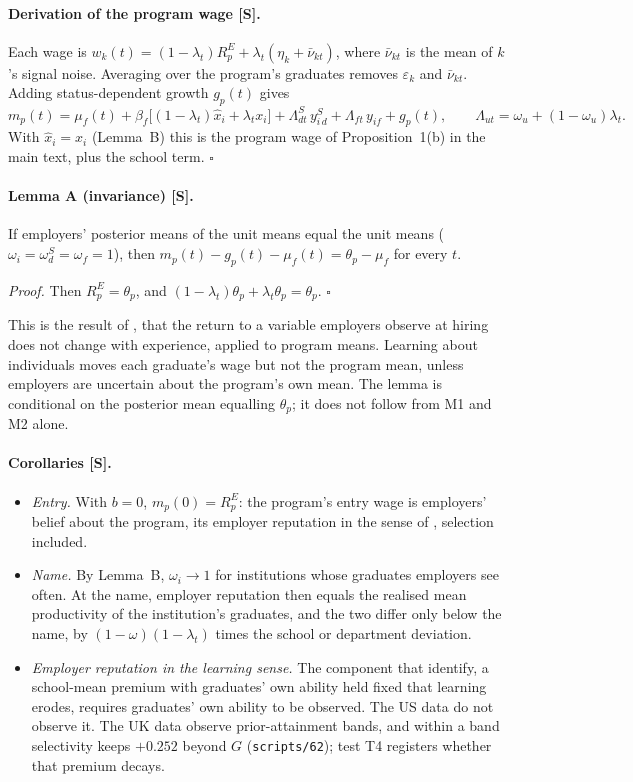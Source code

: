 \paragraph{Derivation of the program wage [S].} Each wage is
$w_k(t)=(1-\lambda_t)R^E_p+\lambda_t(\eta_k+\bar\nu_{kt})$, where $\bar\nu_{kt}$ is the mean of $k$'s signal
noise. Averaging over the program's graduates removes $\varepsilon_k$ and $\bar\nu_{kt}$. Adding status-dependent
growth $g_p(t)$ gives
\begin{equation}\label{eq:T-wage}
m_p(t)=\mu_f(t)+\beta_f\big[(1-\lambda_t)\hat x_i+\lambda_tx_i\big]+\Lambda^S_{dt}\,y^S_{i\,d}+\Lambda_{ft}\,y_{if}+g_p(t),
\qquad \Lambda_{ut}=\omega_u+(1-\omega_u)\lambda_t .
\end{equation}
With $\hat x_i=x_i$ (Lemma~B) this is the program wage of Proposition~1(b) in the main text, plus the school term.
$\square$

\paragraph{Lemma A (invariance) [S].} If employers' posterior means of the unit means equal the unit means
($\omega_i=\omega^S_d=\omega_f=1$), then $m_p(t)-g_p(t)-\mu_f(t)=\theta_p-\mu_f$ for every $t$.

\emph{Proof.} Then $R^E_p=\theta_p$, and $(1-\lambda_t)\theta_p+\lambda_t\theta_p=\theta_p$. $\square$

This is the result of \citet{farber1996learning}, that the return to a variable employers observe at hiring does
not change with experience, applied to program means. Learning about individuals moves each graduate's wage but
not the program mean, unless employers are uncertain about the program's own mean. The lemma is conditional on
the posterior mean equalling $\theta_p$; it does not follow from M1 and M2 alone.

\paragraph{Corollaries [S].}
\begin{itemize}
\item \emph{Entry.} With $b=0$, $m_p(0)=R^E_p$: the program's entry wage is employers' belief about the program,
its employer reputation in the sense of \citet{macleod2015reputation}, selection included.
\item \emph{Name.} By Lemma~B, $\omega_i\to1$ for institutions whose graduates employers see often. At the name,
employer reputation then equals the realised mean productivity of the institution's graduates, and the two differ
only below the name, by $(1-\omega)(1-\lambda_t)$ times the school or department deviation.
\item \emph{Employer reputation in the learning sense.} The component that \citet{macleod2017big} identify, a
school-mean premium with graduates' own ability held fixed that learning erodes, requires graduates' own ability
to be observed. The US data do not observe it. The UK data observe prior-attainment bands, and within a band
selectivity keeps $+0.252$ beyond $G$ (\texttt{scripts/62}); test T4 registers whether that premium decays.
\end{itemize}

